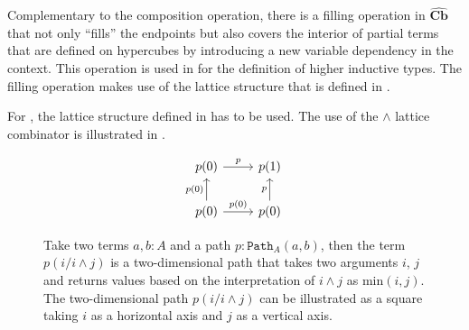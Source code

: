 \documentclass[12pt,a4paper,twoside,xetex]{book} %
\newcommand{\psh}[1]{\widehat{#1}}
\newcommand{\op}[1]{\mathtt{#1}}
\newcommand{\cube}[0]{\textbf{Cb}}
\newcommand{\pa}[3]{\op{Path}_{#1}\left(#2, #3\right)}
\begin{document}
Complementary to the composition operation, there is a filling operation in $\psh{\cube}$ that 
not only ``fills'' the endpoints but also covers the interior of partial terms 
that are defined on hypercubes by introducing a new variable dependency in the 
context. This operation is used in \cite{Coquand2018} for the definition of 
higher inductive types. The filling operation makes use of the lattice 
structure that is defined in . 


% 
% 
%  
% 
%  
%  

% 
% 
% 
% 

For , the lattice structure defined in  has to be 
used. The use of the $\wedge$ lattice combinator is illustrated in 
.

\begin{figure}\label{twopath}
\centering
\[ \begin{tikzcd}
p (0) \arrow[r, "p" ] 
& p(1)  \\
p(0) 	\arrow[u, "p(0)"]	
	\arrow[r, "p(0)"]
& p(0)  \arrow[u, "p"] 
\end{tikzcd}
\]
\caption{Take two terms $a,b:A$ and a path $p : \pa{A}{a}{b}$, then the term 
$p(i/i\wedge j)$ is a two-dimensional path that takes two arguments $i$, $j$ 
and returns values based on the interpretation of $i \wedge j$ as 
$\text{min}(i,j)$. The two-dimensional path $p(i/i\wedge j)$ can be 
illustrated as a square taking $i$ as a horizontal axis and $j$ as a vertical axis.}
\end{figure}
\end{document}
